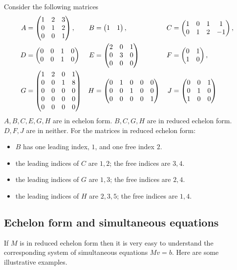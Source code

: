 \documentclass{article}
\begin{document}
\begin{Example}
Consider the following matrices
\begin{align*}
A&=\begin{pmatrix} 1 & 2 & 3 \\ 0 & 1 & 2 \\ 0 & 0 & 1\end{pmatrix},& B&=\begin{pmatrix} 1 & 1\end{pmatrix},& C&=\begin{pmatrix} 1 & 0 & 1 & 1\\ 0 & 1 & 2 & -1\end{pmatrix},\\
D&=\begin{pmatrix} 0 & 0 & 1 & 0 \\ 0 & 0 & 1 & 0\end{pmatrix}& E&=\begin{pmatrix} 2 & 0 & 1 \\ 0 & 3 & 0 \\ 0 & 0 & 0 \end{pmatrix}& F&=\begin{pmatrix} 0 & 1 \\ 1 & 0\end{pmatrix},\\
G&=\begin{pmatrix} 1 & 2 & 0 & 1 \\ 0 & 0 & 1 & 8 \\ 0 & 0 & 0 & 0 \\ 0 & 0 & 0 & 0 \\ 0 & 0 & 0 & 0\end{pmatrix}&H&=\begin{pmatrix} 0 & 1 & 0 & 0 & 0\\ 0 & 0 & 1 & 0 & 0 \\ 0 & 0 & 0 & 0 & 1 \end{pmatrix}&J&=\begin{pmatrix} 0 & 0 & 1 \\ 0 & 1 & 0 \\ 1 & 0 & 0\end{pmatrix}
\end{align*}
\(A,B,C,E,G,H\) are in echelon form. \(B,C,G,H\) are in reduced
echelon form. \(D,F,J\) are in neither. For the matrices in reduced
echelon form:
\begin{itemize}
\item \(B\) has one leading index, \(1\), and one free index \(2\).
\item the leading indices of \(C\) are \(1,2\); the free indices are
\(3,4\).
\item the leading indices of \(G\) are \(1,3\); the free indices are
\(2,4\).
\item the leading indices of \(H\) are \(2,3,5\); the free indices are
\(1,4\).


\end{itemize}
\end{Example}
\subsection{Echelon form and simultaneous equations}


If \(M\) is in reduced echelon form then it is very easy to understand
the corresponding system of simultaneous equations \(Mv=b\). Here are
some illustrative examples.
\end{document}
